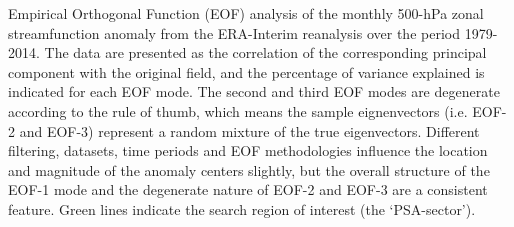 \label{fig:eof}
Empirical Orthogonal Function (EOF) analysis of the monthly 500-hPa zonal streamfunction anomaly from the ERA-Interim reanalysis over the period 1979-2014. The data are presented as the correlation of the corresponding principal component with the original field, and the percentage of variance explained is indicated for each EOF mode. The second and third EOF modes are degenerate according to the \citet{North1982} rule of thumb, which means the sample eignenvectors (i.e. EOF-2 and EOF-3) represent a random mixture of the true eigenvectors. Different filtering, datasets, time periods and EOF methodologies influence the location and magnitude of the anomaly centers slightly, but the overall structure of the EOF-1 mode and the degenerate nature of EOF-2 and EOF-3 are a consistent feature. Green lines indicate the search region of interest (the `PSA-sector').